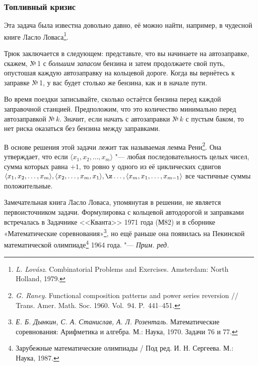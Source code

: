 \documentclass[twoside]{book}
\newenvironment{addedbytheeditors}{\par\medskip\small
}{\par\addvspace{\medskipamount}} %
\begin{document}
\subsubsection*{Топливный кризис} %

Эта задача была известна довольно давно, её можно найти, например, в чудесной книге Ласло Ловаса\footnote{\emph{L. Lov\'asz}. {Combinatorial Problems and Exercises}. Amsterdam: North Holland, 1979.}.

\medskip

Трюк заключается в следующем:
представьте, что вы начинаете на автозаправке, скажем, №\,1 с \emph{большим запасом} бензина и затем продолжаете свой путь, опустошая каждую автозаправку на кольцевой дороге.
Когда вы вернётесь к заправке №\,1, 
у вас будет столько же бензина, как и в начале пути.

Во время поездки записывайте, сколько остаётся бензина перед каждой заправочной станцией.
Предположим, что это количество минимально перед автозаправкой №\,$k$.
Значит, если начать с автозаправки №\,$k$ с пустым баком, то нет риска оказаться без бензина между заправками.
\heart

\begin{addedbytheeditors}
В основе решения этой задачи лежит так называемая лемма Рени\footnote{\emph{G. Raney}. Functional composition patterns and power series reversion /\!/ Trans. Amer. Math. Soc. 1960. Vol.~94. P.~441--451.}.
Она утверждает, что если
$\langle x_1, x_2,\ldots, x_m\rangle$ "--- любая последовательность целых чисел, сумма 
которых равна $+1$, то ровно у одного из её циклических сдвигов 
$\langle x_1, x_2,\ldots , x_m\rangle, \langle x_2, \ldots, x_m, x_1\rangle, \z\ldots, \langle x_m, x_1, \ldots, x_{m-1}\rangle$
все частичные суммы  положительные. 

Замечательная книга Ласло Ловаса, упомянутая в решении, не является первоисточником задачи.
Формулировка с кольцевой автодорогой и заправками встречалась в Задачнике <<Кванта>> 1971 года (М82)
и в сборнике «Математические соревнования»\footnote{%
\emph{Е. Б. Дынкин, С. А. Станислав, А. Л. Розенталь}. Математические соревнования: Арифметика и алгебра. М.: Наука, 1970. Задачи 76 и 77.}, но ещё раньше она появилась на Пекинской математической олимпиаде\footnote{%
Зарубежные математические олимпиады / Под ред. И. Н. Сергеева.
М.: Наука, 1987.} 1964 года. "--- \emph{Прим. ред.}
\end{addedbytheeditors}
\end{document}
